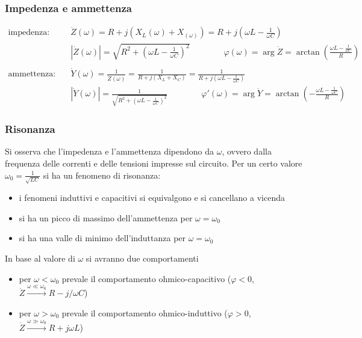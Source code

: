 \documentclass[a4paper]{article}
\begin{document}
\subsubsection*{Impedenza e ammettenza}
\begin{align*}
	\text{impedenza:} \quad &\dot{Z}(\omega) = R + j(X_L(\omega) + X_(\omega)) = R + j\left(\omega L - \frac{1}{\omega C}\right) \\
	&\left|\dot{Z}(\omega)\right| = \sqrt{R^2 + \left(\omega L - \frac{1}{\omega C}\right)^2} \qquad \qquad \varphi(\omega) = \arg \dot{Z} = \arctan \left(\frac{\omega L - \frac{1}{\omega C}}{R}\right) \\
	& \\
	\text{ammettenza:} \quad &\dot{Y}(\omega) = \frac{1}{\dot{Z}(\omega)} = \frac{1}{R + j(X_L + X_C)} = \frac{1}{R + j\left(\omega L - \frac{1}{\omega C}\right)} \\
	&\left|\dot{Y}(\omega)\right| = \frac{1}{\sqrt{R^2 + \left(\omega L - \frac{1}{\omega C}\right)^2}} \qquad\qquad \varphi'(\omega) = \arg \dot{Y} = \arctan \left(-\frac{\omega L - \frac{1}{\omega C}}{R}\right)
\end{align*}

\subsubsection*{Risonanza}
Si osserva che l'impedenza e l'ammettenza dipendono da \(\omega\), ovvero dalla frequenza delle correnti e delle tensioni impresse
sul circuito. Per un certo valore \(\omega_0 = \frac{1}{\sqrt{LC}}\) si ha un fenomeno di risonanza:
\begin{itemize}
	\item i fenomeni induttivi e capacitivi si equivalgono e si cancellano a vicenda
	\item si ha un picco di massimo dell'ammettenza per \(\omega = \omega_0\)
	\item si ha una valle di minimo dell'induttanza per \(\omega = \omega_0\)
\end{itemize}
In base al valore di \(\omega\) si avranno due comportamenti
\begin{itemize}
	\item per \(\omega < \omega_0\) prevale il comportamento ohmico-capacitivo (\(\varphi < 0\), \(\dot{Z} \stackrel{\omega \ll \omega_0}{\longrightarrow} R - j / \omega C\))
	\item per \(\omega > \omega_0\) prevale il comportamento ohmico-induttivo (\(\varphi > 0\), \(\dot{Z} \stackrel{\omega \gg \omega_0}{\longrightarrow} R + j\omega L\))
\end{itemize}
\end{document}
